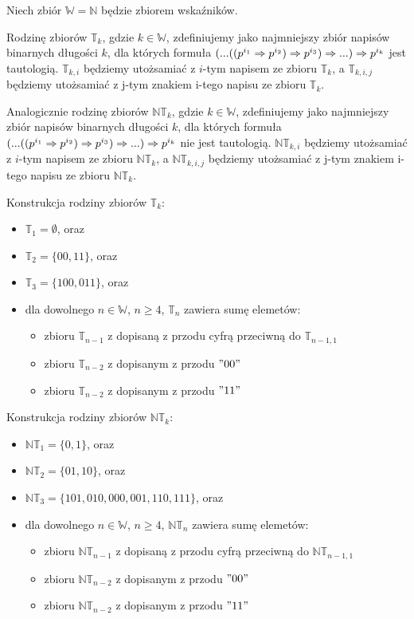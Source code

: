 Niech zbiór $\mathbb{W} = \mathbb{N}$ będzie zbiorem wskaźników.
\n

\noindent
Rodzinę zbiorów $\mathbb{T}_k$, gdzie $k \in \mathbb{W}$, zdefiniujemy jako najmniejszy zbiór napisów binarnych długości $k$, dla których formuła $(... (( p^{i_1} \Rightarrow p^{i_2} ) \Rightarrow p^{i_3}) \Rightarrow ...) \Rightarrow p^{i_k}$ jest tautologią. $\mathbb{T}_{k, i}$ będziemy utożsamiać z $i$-tym napisem ze zbioru $\mathbb{T}_k$, a $\mathbb{T}_{k, i, j}$ będziemy utożsamiać z j-tym znakiem i-tego napisu ze zbioru $\mathbb{T}_{k}$.
\n

\noindent
Analogicznie rodzinę zbiorów $\mathbb{NT}_k$, gdzie $k \in \mathbb{W}$, zdefiniujemy jako najmniejszy zbiór napisów binarnych długości $k$, dla których formuła $(... (( p^{i_1} \Rightarrow p^{i_2} ) \Rightarrow p^{i_3}) \Rightarrow ...) \Rightarrow p^{i_k}$ nie jest tautologią. $\mathbb{NT}_{k, i}$ będziemy utożsamiać z $i$-tym napisem ze zbioru $\mathbb{NT}_k$, a $\mathbb{NT}_{k, i, j}$ będziemy utożsamiać z j-tym znakiem i-tego napisu ze zbioru $\mathbb{NT}_{k}$.
\n

\noindent
Konstrukcja rodziny zbiorów $\mathbb{T}_k$:
\begin{itemize}
	\item $\mathbb{T}_1 = \emptyset$, oraz
	\item $\mathbb{T}_2 = \{00, 11\}$, oraz
	\item $\mathbb{T}_3 = \{100, 011\}$, oraz
	\item dla dowolnego $n \in \mathbb{W}$, $n \geq 4$, $\mathbb{T}_n$ zawiera sumę elemetów:
	\begin{itemize}
		\item zbioru $\mathbb{T}_{n - 1}$ z dopisaną z przodu cyfrą przeciwną do $\mathbb{T}_{n - 1, 1}$
		\item zbioru $\mathbb{T}_{n - 2}$ z dopisanym z przodu $"00"$
		\item zbioru $\mathbb{T}_{n - 2}$ z dopisanym z przodu $"11"$
	\end{itemize}
\end{itemize}

\noindent
Konstrukcja rodziny zbiorów $\mathbb{NT}_k$:
\begin{itemize}
	\item $\mathbb{NT}_1 = \{0, 1\}$, oraz
	\item $\mathbb{NT}_2 = \{01, 10\}$, oraz
	\item $\mathbb{NT}_3 = \{101, 010, 000, 001, 110, 111\}$, oraz
	\item dla dowolnego $n \in \mathbb{W}$, $n \geq 4$, $\mathbb{NT}_n$ zawiera sumę elemetów:
	\begin{itemize}
		\item zbioru $\mathbb{NT}_{n - 1}$ z dopisaną z przodu cyfrą przeciwną do $\mathbb{NT}_{n - 1, 1}$
		\item zbioru $\mathbb{NT}_{n - 2}$ z dopisanym z przodu $"00"$
		\item zbioru $\mathbb{NT}_{n - 2}$ z dopisanym z przodu $"11"$
	\end{itemize}
\end{itemize}